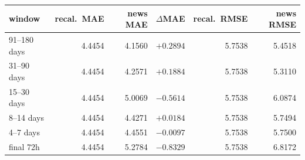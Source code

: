 \begin{tabular}{lrrrrr}
\toprule
window & recal.\ MAE & news MAE & $\Delta$MAE & recal.\ RMSE & news RMSE \\
\midrule
91--180 days & 4.4454 & 4.1560 & $+0.2894$ & 5.7538 & 5.4518 \\
31--90 days  & 4.4454 & 4.2571 & $+0.1884$ & 5.7538 & 5.3110 \\
15--30 days  & 4.4454 & 5.0069 & $-0.5614$ & 5.7538 & 6.0874 \\
8--14 days   & 4.4454 & 4.4271 & $+0.0184$ & 5.7538 & 5.7494 \\
4--7 days    & 4.4454 & 4.4551 & $-0.0097$ & 5.7538 & 5.7500 \\
final 72h    & 4.4454 & 5.2784 & $-0.8329$ & 5.7538 & 6.8172 \\
\bottomrule
\end{tabular}
